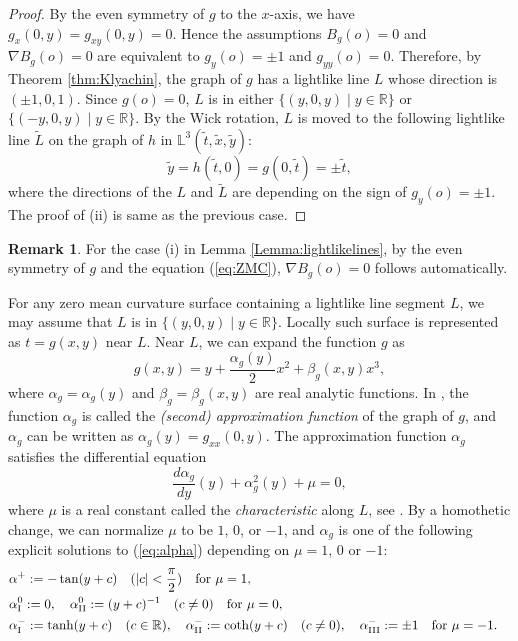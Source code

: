 \documentclass[12pt,amstex]{amsart}%
\theoremstyle{plain} %
\theoremstyle{definition}
\newtheorem{remark}[theorem]{Remark}
\begin{document}
\begin{proof}
By the even symmetry of $g$ to the $x$-axis, we have $g_{x}(0,y)=g_{xy}(0,y)=0$. Hence the assumptions $B_g(o)=0$ and $\nabla{B_g}(o)=0$ are equivalent to $g_y(o)=\pm 1$ and $g_{yy}(o)=0$. Therefore, by Theorem \ref{thm:Klyachin}, the graph of $g$ has a lightlike line $L$ whose direction is $(\pm 1,0,1)$. Since $g(o)=0$, $L$ is in either $\{(y,0,y)\mid y\in \mathbb{R}\}$ or $\{(-y,0,y)\mid y\in \mathbb{R}\}$. By the Wick rotation, $L$ is moved to the following lightlike line $\tilde{L}$ on the graph of $h$ in $\mathbb{L}^3(\tilde{t},\tilde{x},\tilde{y})$:
\[
\tilde{y}=h(\tilde{t},0)=g(0,\tilde{t})=\pm \tilde{t},
\]
where the directions of the $L$ and $\tilde{L}$ are depending on the sign of $g_y(o)=\pm1$. The proof of (ii) is same as the previous case.
\end{proof}
\begin{remark}
For the case (i) in Lemma \ref{Lemma:lightlikelines}, by the even symmetry of $g$ and the equation (\ref{eq:ZMC}), $\nabla{B_g}(o)=0$ follows automatically.
\end{remark}
For any zero mean curvature surface containing a lightlike line segment $L$, we may assume that $L$ is in $\{(y,0,y)\mid y\in \mathbb{R}\}$. Locally such surface is represented as $t=g(x,y)$ near $L$. Near $L$, we can expand the function $g$ as
\begin{equation}
g(x,y)=y+\frac{\alpha_g(y)}{2}x^2+\beta_g(x,y)x^3,
\end{equation}
where $\alpha_g=\alpha_g(y)$ and $\beta_g=\beta_g(x,y)$ are real analytic functions. In \cite{UY}, the function $\alpha_g$ is called the {\it (second) approximation function} of the graph of $g$, and $\alpha_g$ can be written as $\alpha_g(y)=g_{xx}(0,y)$. The approximation function $\alpha_g$ satisfies the differential equation
\begin{equation}\label{eq:alpha}
\frac{d\alpha_g}{dy}(y)+\alpha_g ^2(y)+\mu =0,
\end{equation}
where $\mu $ is a real constant called the {\it characteristic} along $L$, see \cite{FujimoriETAL1}. By a homothetic change, we can normalize $\mu$ to be $1$, $0$, or $-1$, and $\alpha_g$ is one of the following explicit solutions to (\ref{eq:alpha}) depending on $\mu=1$, $0$ or $-1$:
 \begin{align}
 & \alpha^+:=-\tan(y+c)\quad (|c|<\frac{\pi}{2})\quad \text{for $\mu=1$},& \nonumber\\
 & \alpha^0_{\rm I}:=0,\quad \alpha^0_{\rm II}:=(y+c)^{-1}\quad (c\neq 0)\quad  \text{for $\mu=0$},& \nonumber\\
 & \alpha^{-}_{\rm I}:=\tanh(y+c)\quad (c\in \mathbb{R}),\quad  \alpha^{-}_{\rm II}:=\coth(y+c)\quad (c\neq0),\quad \alpha^{-}_{\rm III}:=\pm 1\quad \text{for $\mu=-1$}.&\nonumber
 \end{align}
\end{document}
